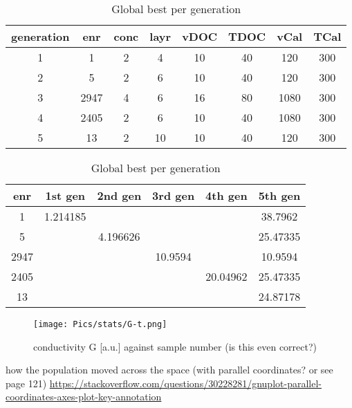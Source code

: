 \begin{table}[h]
	\centering
    \caption{Global best per generation}
	\label{tab:emma-Gb}
	\begin{tabular}{cccccccc}
        \hline\hline
    generation  &enr &conc &layr &vDOC &TDOC &vCal &TCal\\
        \hline
     1   &1       &2    &4   &10   &40  &120  &300\\
     2   &5       &2    &6   &10   &40  &120  &300\\
     3   &2947    &4    &6   &16   &80 &1080  &300\\
     4   &2405    &2    &6   &10   &40 &1080  &300\\
     5   &13      &2   &10   &10   &40  &120  &300\\
    \hline\hline
	\end{tabular}
\begin{tabular}{cccccc}
    \hline\hline
enr     &1st gen     &2nd gen        &3rd gen        &4th gen        &5th gen\\
    \hline
1       &1.214185    &       &       &       &38.7962       \\
5       &       &4.196626       &       &       &25.47335       \\
2947    &       &       &10.9594    &       &10.9594       \\
2405    &       &       &       &20.04962   &25.47335       \\
13      &       &       &       &       &24.87178   \\
    \hline\hline
\end{tabular}
\end{table}


\begin{figure}
\centering
\texttt{[image: Pics/stats/G-t.png]}
    \caption{conductivity G [a.u.] against sample number (is this even correct?)}
    \label{fig:G-t}
\end{figure}

 how the population moved across the space (with parallel coordinates? or see page 121)
\url{https://stackoverflow.com/questions/30228281/gnuplot-parallel-coordinates-axes-plot-key-annotation}

